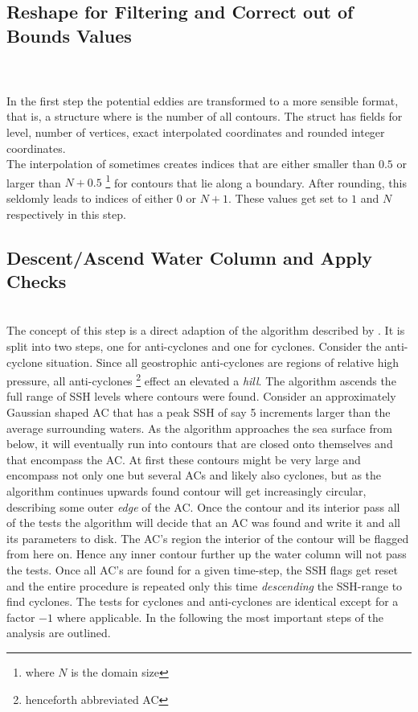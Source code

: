 \subsection*{Reshape for Filtering and Correct out of Bounds Values}
\\
\\
In the first step the potential eddies are transformed to a more sensible
format, that is, a structure  where 
is the number of all contours. The struct has fields for level, number of
vertices, exact \ie interpolated coordinates and rounded integer coordinates.\\
The interpolation of  sometimes creates indices that are
either smaller than $0.5$ or larger than $N+0.5$ \footnote{where $N$ is the
domain size} for contours that lie along a boundary. After rounding, this
seldomly leads to indices of either $0$ or $N+1$. These values get set to $1$
and $N$ respectively in this step.
\subsection*{Descent/Ascend Water Column and Apply Checks}
 \\
The concept of this step is a direct adaption of the algorithm described
by \cite{Chelton2011}. It is split into two steps, one for anti-cyclones and one
for cyclones. Consider \eg the anti-cyclone situation. Since all
geostrophic anti-cyclones are regions of relative high pressure, all
anti-cyclones \footnote{henceforth abbreviated AC} effect an elevated \SSH \ie
a \textit{hill}. The algorithm ascends the full range of SSH levels where
contours were found. Consider an approximately Gaussian shaped AC that has a
peak SSH of say 5 increments larger than the average surrounding waters. 
As the algorithm approaches the sea surface from below, it will eventually run
into contours that are closed onto themselves and that encompass the AC. At
first these contours might be very large and encompass not only one but several
ACs and likely also cyclones, but as the algorithm continues upwards found
contour will get increasingly circular, describing some outer \textit{edge} of
the AC. Once the contour and its interior pass all of the tests the algorithm
will decide that an AC was found and write it and all its parameters to disk.
The AC's region \ie the interior of the contour will be flagged from here on.
Hence any inner contour further up the water column will not pass the tests.
Once all AC's are found for a given time-step, the SSH flags get reset and the
entire procedure is repeated only this time \textit{descending} the SSH-range to
find cyclones. The tests for cyclones and anti-cyclones are identical except for
a factor $-1$ where applicable. In the following the most important steps of the
analysis are
outlined.
